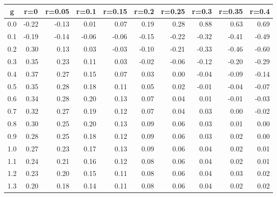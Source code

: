 %
\begin{table}[!tbp]
 \begin{center}
 \begin{tabular}{rrrrrrrrrr}\hline\hline
\multicolumn{1}{c}{g}&\multicolumn{1}{c}{r=0}&\multicolumn{1}{c}{r=0.05}&\multicolumn{1}{c}{r=0.1}&\multicolumn{1}{c}{r=0.15}&\multicolumn{1}{c}{r=0.2}&\multicolumn{1}{c}{r=0.25}&\multicolumn{1}{c}{r=0.3}&\multicolumn{1}{c}{r=0.35}&\multicolumn{1}{c}{r=0.4}\tabularnewline
\hline
0.0&-0.22&-0.13& 0.01& 0.07& 0.19& 0.28& 0.88& 0.63& 0.69\tabularnewline
0.1&-0.19&-0.14&-0.06&-0.06&-0.15&-0.22&-0.32&-0.41&-0.49\tabularnewline
0.2& 0.30& 0.13& 0.03&-0.03&-0.10&-0.21&-0.33&-0.46&-0.60\tabularnewline
0.3& 0.35& 0.23& 0.11& 0.03&-0.02&-0.06&-0.12&-0.20&-0.29\tabularnewline
0.4& 0.37& 0.27& 0.15& 0.07& 0.03& 0.00&-0.04&-0.09&-0.14\tabularnewline
0.5& 0.35& 0.28& 0.18& 0.11& 0.05& 0.02&-0.01&-0.04&-0.07\tabularnewline
0.6& 0.34& 0.28& 0.20& 0.13& 0.07& 0.04& 0.01&-0.01&-0.03\tabularnewline
0.7& 0.32& 0.27& 0.19& 0.12& 0.07& 0.04& 0.03& 0.00&-0.02\tabularnewline
0.8& 0.30& 0.25& 0.20& 0.13& 0.09& 0.06& 0.03& 0.01& 0.00\tabularnewline
0.9& 0.28& 0.25& 0.18& 0.12& 0.09& 0.06& 0.03& 0.02& 0.00\tabularnewline
1.0& 0.27& 0.23& 0.17& 0.13& 0.09& 0.06& 0.04& 0.02& 0.01\tabularnewline
1.1& 0.24& 0.21& 0.16& 0.12& 0.08& 0.06& 0.04& 0.02& 0.01\tabularnewline
1.2& 0.23& 0.20& 0.15& 0.11& 0.08& 0.06& 0.04& 0.03& 0.02\tabularnewline
1.3& 0.20& 0.18& 0.14& 0.11& 0.08& 0.06& 0.04& 0.02& 0.02\tabularnewline
\hline
\end{tabular}

\end{center}

\end{table}

